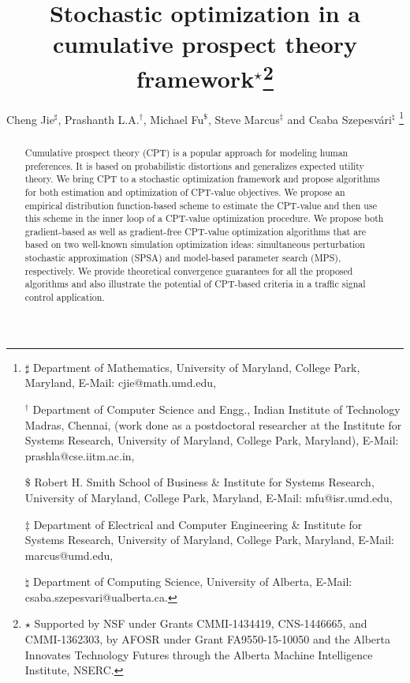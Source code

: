 \documentclass[twocolumn]{IEEEtran}
\begin{document}
\title{Stochastic optimization in a cumulative prospect theory framework$^\star$\thanks{$\star$ Supported by NSF under Grants CMMI-1434419, CNS-1446665, and
CMMI-1362303, by AFOSR under Grant FA9550-15-10050 and the Alberta Innovates Technology Futures through the Alberta Machine Intelligence Institute, NSERC.}}
\author{Cheng Jie$^\sharp$, Prashanth L.A.$^\dagger$, Michael Fu$^\$$, Steve Marcus$^\ddag$ and Csaba Szepesv\'ari$^\natural$
\thanks{
$\sharp$ Department of Mathematics,
University of Maryland, College Park, Maryland, 
E-Mail: cjie@math.umd.edu, 

$^\dagger$ Department of Computer Science and Engg., Indian Institute of Technology Madras, Chennai,
(work done as a postdoctoral researcher at the Institute for Systems Research, University of Maryland, College Park, Maryland),
E-Mail: prashla@cse.iitm.ac.in,

$\$$ Robert H. Smith School of Business \& Institute for Systems Research,
University of Maryland, College Park, Maryland,
E-Mail: mfu@isr.umd.edu,

$\ddag$ Department of Electrical and Computer Engineering \& Institute for Systems Research,
University of Maryland, College Park, Maryland,
 E-Mail: marcus@umd.edu,

$\natural$ Department of Computing Science,
University of Alberta,
 E-Mail: csaba.szepesvari@ualberta.ca.
}}
\maketitle


\begin{abstract}
Cumulative prospect theory (CPT) is a popular approach for modeling human preferences. It is based on probabilistic distortions and generalizes expected utility theory.  We bring CPT to a stochastic optimization framework and propose algorithms for both estimation and optimization of CPT-value objectives. We propose an empirical distribution function-based scheme to estimate the CPT-value and then use this scheme in the inner loop of a CPT-value optimization procedure. We propose both gradient-based as well as gradient-free CPT-value optimization algorithms that are based on two well-known simulation optimization ideas: simultaneous perturbation stochastic approximation (SPSA) and model-based parameter search (MPS), respectively.  We provide theoretical convergence guarantees for all the proposed algorithms 
and also illustrate the potential of CPT-based criteria in a traffic signal control application.
\end{abstract}
\end{document}
